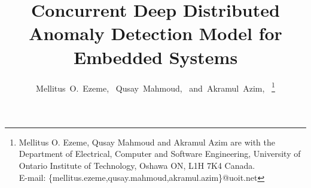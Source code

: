 \documentclass[journal]{IEEEtran}
\begin{document}
%
\title{Concurrent Deep Distributed Anomaly Detection Model for Embedded 
Systems}
%
%
%

\author{Mellitus~O.~Ezeme,~
	Qusay~Mahmoud,~
	and~Akramul~Azim,~%
\thanks{Mellitus O. Ezeme, Qusay Mahmoud and Akramul Azim are with the 
Department	of 
Electrical, Computer and Software 
	Engineering, University of Ontario Institute of Technology, Oshawa ON, L1H 
	7K4 
	Canada.\protect\\
	E-mail: \{mellitus.ezeme,qusay.mahmoud,akramul.azim\}@uoit.net
}%
}

% 




\end{document}
